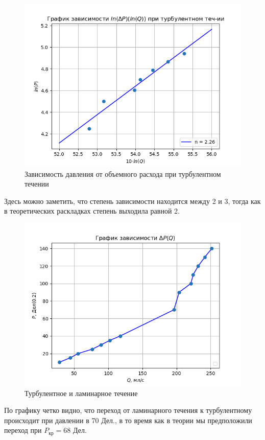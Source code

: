 \begin{figure}[h!]
    \centering
    \includegraphics[width=12cm]{plot4.png}
    \caption{Зависимость давления от объемного расхода 
    при турбулентном течении}
    \label{fig:plot4}
\end{figure}
Здесь можно заметить, что степень зависимости находится между 2 и 3, тогда как в 
теоретических раскладках степень выходила равной 2. 

\begin{figure}[h!]
    \centering
    \includegraphics[width=12cm]{plotall2.png}
    \caption{Турбулентное и ламинарное течение}
    \label{fig:plotall2}
\end{figure}

По графику четко видно, что переход от ламинарного течения к турбулентному 
происходит при давлении в 70 Дел., в то время как в теории мы предположили
переход при $P_{\text{кр}} = 68$ Дел. 

